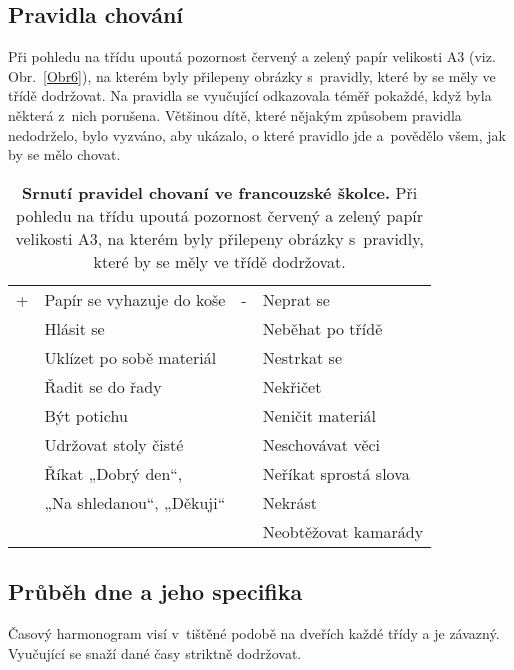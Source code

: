 		\subsection{Pravidla chování}
		\label{pravidlaChovani}
			Při pohledu na třídu upoutá pozornost červený a zelený papír velikosti A3 (viz. Obr.~\ref{Obr6}), na kterém byly přilepeny obrázky s pravidly, které by se měly ve třídě dodržovat. Na pravidla se vyučující odkazovala téměř pokaždé, když byla některá z nich porušena. Většinou dítě, které nějakým způsobem pravidla nedodrželo, bylo vyzváno, aby ukázalo, o které pravidlo jde a povědělo všem, jak by se mělo chovat. 

			\begin{spacing}{1.0}
			\begin{table}[h!]
				\center
				\begin{tabular}{|ll|ll|}
					\hline
					\rowcolor{grey!0}
				+	& Papír se vyhazuje do koše						& -	& Neprat se 			\\
					& Hlásit se 									&  	& Neběhat po třídě		\\
					& Uklízet po sobě materiál 						&	& Nestrkat se 			\\
					& Řadit se do řady 								&	& Nekřičet 				\\
					& Být potichu 									& 	& Neničit materiál 		\\
					& Udržovat stoly čisté 							& 	& Neschovávat věci 		\\
					& Říkat „Dobrý den“,							&	& Neříkat sprostá slova \\
					&  „Na shledanou“, „Děkuji“						&	& Nekrást				\\
					&												&	& Neobtěžovat kamarády 	\\
					\hline
				\end{tabular}
				\caption{ \textbf{Srnutí pravidel chovaní ve francouzské školce.}
					Při pohledu na třídu upoutá pozornost červený a zelený papír velikosti A3, na kterém byly přilepeny obrázky s pravidly, které by se měly ve třídě dodržovat.
				}
				\label{tab:pravidlaFR}
			\end{table}
			\end{spacing}




		\subsection{Průběh dne a jeho specifika}

			Časový harmonogram visí v tištěné podobě na dveřích každé třídy a je závazný. Vyučující se snaží dané časy striktně dodržovat.

